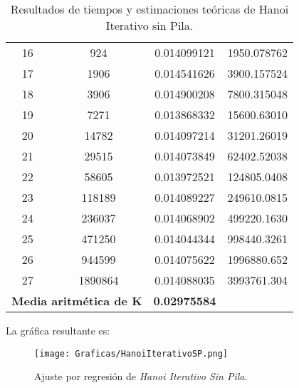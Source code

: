 \documentclass[a4paper,12pt]{article} %
\begin{document}
\begin{table}[H]
{\begin{tabular}{|c|c|c|c|}
			16                                                 & 924                  & 0.014099121              & 1950.078762                                          \\
			17                                                 & 1906                 & 0.014541626              & 3900.157524                                          \\
			18                                                 & 3906                 & 0.014900208              & 7800.315048                                          \\
			19                                                 & 7271                 & 0.013868332              & 15600.63010                                          \\
			20                                                 & 14782                & 0.014097214              & 31201.26019                                          \\
			21                                                 & 29515                & 0.014073849              & 62402.52038                                          \\
			22                                                 & 58605                & 0.013972521              & 124805.0408                                          \\
			23                                                 & 118189               & 0.014089227              & 249610.0815                                          \\
			24                                                 & 236037               & 0.014068902              & 499220.1630                                          \\
			25                                                 & 471250               & 0.014044344              & 998440.3261                                          \\
			26                                                 & 944599               & 0.014075622              & 1996880.652                                          \\
			27                                                 & 1890864              & 0.014088035              & 3993761.304                                          \\
			\hline
			\multicolumn{2}{l}{\textbf{Media aritmética de K}} & \textbf{0.02975584}                                                                                    \\
			\hline
		\end{tabular}
	}
	\caption{Resultados de tiempos y estimaciones teóricas de Hanoi Iterativo sin Pila.}
	\label{tab:tiempos}
\end{table}
La gráfica resultante es:
\begin{figure}[H]
	\centering
	\texttt{[image: Graficas/HanoiIterativoSP.png]}
	\caption{Ajuste por regresión de \textit{Hanoi Iterativo Sin Pila}.}
\end{figure}
\end{document}
